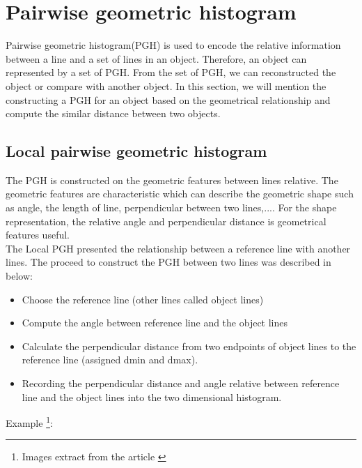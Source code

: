 \section{Pairwise geometric histogram}
Pairwise geometric histogram(PGH) is used to encode the relative information between a line and a set of lines in an object. Therefore, an object can represented by a set of PGH. From the set of PGH, we can reconstructed the object or compare with another object. In this section, we will mention the constructing a PGH for an object based on the geometrical relationship and compute the similar distance between two objects.

\subsection{Local pairwise geometric histogram}
The PGH is constructed on the geometric features between lines relative. The geometric features are characteristic which can describe the geometric shape such as angle, the length of line, perpendicular between two lines,.... For the shape representation, the relative angle and perpendicular distance is geometrical features useful. \\
The Local PGH presented the relationship between a reference line with another lines. The proceed to construct the PGH between two lines was described in below:
\begin{itemize}
\item Choose the reference line (other lines called object lines)
\item Compute the angle between reference line and the object lines
\item Calculate the perpendicular distance from two endpoints of object lines to the reference line (assigned dmin and dmax).
\item Recording the perpendicular distance and angle relative between reference line and the object lines into the two dimensional histogram.
\end{itemize}
Example \footnote{Images extract from the article \cite{palaniswamy2010automatic}}:\\
